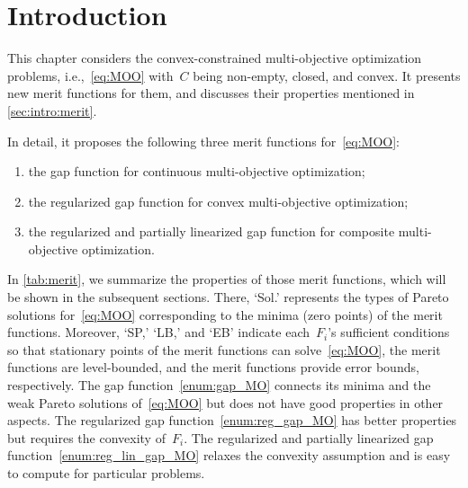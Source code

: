 \documentclass[../main]{subfiles}
\begin{document}
\section{Introduction}
This chapter considers the convex-constrained multi-objective optimization problems, i.e.,~\cref{eq:MOO} with~$C$ being non-empty, closed, and convex.
It presents new merit functions for them, and discusses their properties mentioned in \cref{sec:intro:merit}.

In detail, it proposes the following three merit functions for~\cref{eq:MOO}: 
\begin{enumerate}
    \item the gap function for continuous multi-objective optimization; \label{enum:gap_MO}
    \item the regularized gap function for convex multi-objective optimization; \label{enum:reg_gap_MO}
    \item the regularized and partially linearized gap function for composite multi-objective optimization. \label{enum:reg_lin_gap_MO}
\end{enumerate}
In \cref{tab:merit}, we summarize the properties of those merit functions, which will be shown in the subsequent sections.
There, `Sol.' represents the types of Pareto solutions for~\cref{eq:MOO} corresponding to the minima (zero points) of the merit functions.
Moreover, `SP,' `LB,' and `EB' indicate each~$F_i$'s sufficient conditions so that stationary points of the merit functions can solve~\cref{eq:MOO}, the merit functions are level-bounded, and the merit functions provide error bounds, respectively.
The gap function~\cref{enum:gap_MO} connects its minima and the weak Pareto solutions of~\cref{eq:MOO} but does not have good properties in other aspects.
The regularized gap function~\cref{enum:reg_gap_MO} has better properties but requires the convexity of~$F_i$.
The regularized and partially linearized gap function~\cref{enum:reg_lin_gap_MO} relaxes the convexity assumption and is easy to compute for particular problems.
\end{document}
